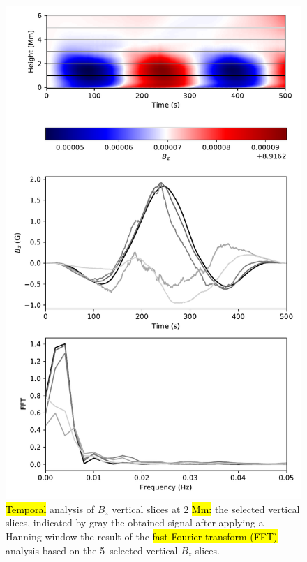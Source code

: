 \documentclass[physics,article,accept,pdftex,moreauthors]{Definitions/mdpi}
\begin{document}
 \begin{figure}[H]
    \includegraphics[width=9%
.5cm]{fft_sim.pdf}
    \caption{\hl{Temporal} %
analysis of $B_{z}$ vertical slices at $2$ \hl{Mm:}  %
the selected vertical slices, indicated by gray 
the obtained signal after applying a Hanning window  %
the result of the \hl{fast Fourier transform  
(FFT)} analysis based on the 5~selected vertical $B_{z}$ slices.\label{fig10}}
\end{figure}
\end{document}
